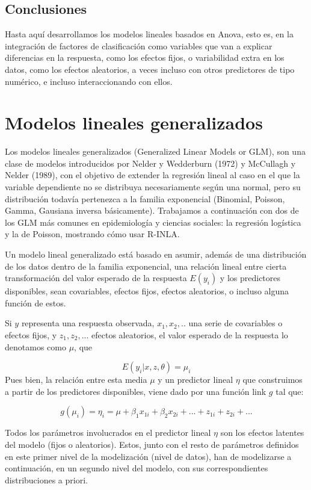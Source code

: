 \documentclass[
]{book}
\begin{document}
\hypertarget{conclusiones-1}{%
\section{Conclusiones}\label{conclusiones-1}}

Hasta aquí desarrollamos los modelos lineales basados en Anova, esto es, en la integración de factores de clasificación como variables que van a explicar diferencias en la respuesta, como los efectos fijos, o variabilidad extra en los datos, como los efectos aleatorios, a veces incluso con otros predictores de tipo numérico, e incluso interaccionando con ellos.

\hypertarget{glm}{%
\chapter{Modelos lineales generalizados}\label{glm}}

Los modelos lineales generalizados (Generalized Linear Models or GLM), son una clase de modelos introducidos por Nelder y Wedderburn (1972) y McCullagh y Nelder (1989), con el objetivo de extender la regresión lineal al caso en el que la variable dependiente no se distribuya necesariamente según una normal, pero su distribución todavía pertenezca a la familia exponencial (Binomial, Poisson, Gamma, Gausiana inversa básicamente). Trabajamos a continuación con dos de los GLM más comunes en epidemiología y ciencias sociales: la regresión logística y la de Poisson, mostrando cómo usar R-INLA.

Un modelo lineal generalizado está basado en asumir, además de una distribución de los datos dentro de la familia exponencial, una relación lineal entre cierta transformación del valor esperado de la respuesta \(E(y_i)\) y los predictores disponibles, sean covariables, efectos fijos, efectos aleatorios, o incluso alguna función de estos.

Si \(y\) representa una respuesta observada, \(x_1,x_2,..\) una serie de covariables o efectos fijos, y \(z_1,z_2,...\) efectos aleatorios, el valor esperado de la respuesta lo denotamos como \(\mu\), que

\[E(y_i|x,z,\theta)=\mu_i\]
Pues bien, la relación entre esta media \(\mu\) y un predictor lineal \(\eta\) que construimos a partir de los predictores disponibles, viene dado por una función link \(g\) tal que:

\[g(\mu_i)=\eta_i=\mu + \beta_1 x_{1i} +   \beta_2 x_{2i} +...+ z_{1i} + z_{2i}+...\]

Todos los parámetros involucrados en el predictor lineal \(\eta\) son los efectos latentes del modelo (fijos o aleatorios). Estos, junto con el resto de parámetros definidos en este primer nivel de la modelización (nivel de datos), han de modelizarse a continuación, en un segundo nivel del modelo, con sus correspondientes distribuciones a priori.
\end{document}
